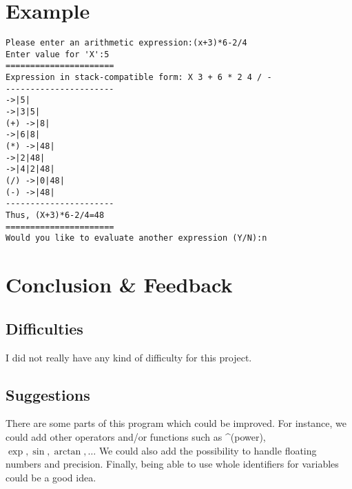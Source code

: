 \documentclass[a4paper,11pt,titlepage]{article}
\begin{document}
\section{Example}

\begin{verbatim}
Please enter an arithmetic expression:(x+3)*6-2/4
Enter value for 'X':5
======================
Expression in stack-compatible form: X 3 + 6 * 2 4 / -
----------------------
->|5|
->|3|5|
(+) ->|8|
->|6|8|
(*) ->|48|
->|2|48|
->|4|2|48|
(/) ->|0|48|
(-) ->|48|
----------------------
Thus, (X+3)*6-2/4=48
======================
Would you like to evaluate another expression (Y/N):n
\end{verbatim}
\section{Conclusion \& Feedback}
\subsection{Difficulties}
I did not really have any kind of difficulty for this project. 

\subsection{Suggestions}
There are some parts of this program which could be improved. For instance, we could add other operators and/or functions such as \textasciicircum (power), $\exp, \sin, \arctan, \ldots$ We could also add the possibility to handle floating numbers and precision. Finally, being able to use whole identifiers for variables could be a good idea.
\end{document}

